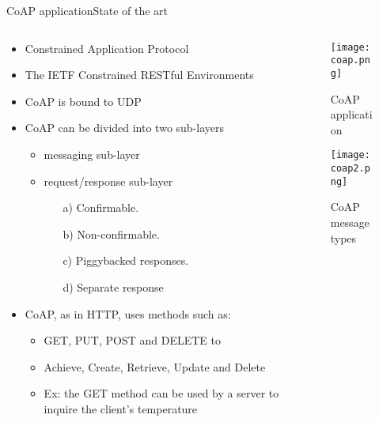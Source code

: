 \begin{frame}{CoAP application}{State of the art}
	\begin{columns}
	
		\begin{column}{0.5\textwidth}
			\begin{itemize}
				\item Constrained Application Protocol
				\item The IETF Constrained RESTful Environments
				\item CoAP is bound to UDP
				\item CoAP can be divided into two sub-layers
					\begin{itemize}
						\item messaging sub-layer
						\item request/response sub-layer
						\begin{itemize}
							\item[a)] Confirmable. 
							\item[b)] Non-confirmable. 
							\item[c)] Piggybacked responses. 
							\item[d)] Separate response
						\end{itemize}
					\end{itemize}
				\item CoAP, as in HTTP, uses methods such as:
					\begin{itemize}
						\item GET, PUT, POST and DELETE to 
						\item Achieve, Create, Retrieve, Update and Delete
					\end{itemize}
					\begin{itemize}
						\item Ex: the GET method can be used by a server to inquire the client’s temperature
					\end{itemize}
			\end{itemize}
			
		\end{column}
		
		\begin{column}{0.5\textwidth}
			\begin{center}
			
				\begin{figure}
					\texttt{[image: coap.png]}
					\caption{\label{fig:coap} CoAP application}
				\end{figure}
				
				\begin{figure}
					\texttt{[image: coap2.png]}
					\caption{\label{fig:coap22} CoAP message types}
				\end{figure}
				
			\end{center}
		\end{column}
		
	\end{columns}
	
\end{frame}


